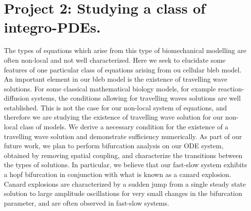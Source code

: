 \documentclass[11pt]{amsart}
\begin{document}
\section*{Project 2: Studying a class of integro-PDEs.}
The types of equations which arise from this type of biomechanical modelling are often non-local and not well characterized. Here we seek to elucidate some features of one particular class of equations arising from ou cellular bleb model. An important element in our bleb model is the existence of travelling wave solutions. For some classical mathematical biology models, for example reaction-diffusion systems, the conditions allowing for travelling waves solutions are well established. This is not the case for our  non-local system of equations, and therefore we are studying the existence of travelling wave solution for our non-local class of models. We derive a necessary condition for the existence of a travelling wave solution and demonstrate sufficiency numerically. As part of our future work, we plan to perform bifurcation analysis on our ODE system, obtained by removing spatial coupling, and characterize the transitions between the types of solutions. In particular, we believe that our fast-slow system exhibits a hopf bifurcation in conjunction with what is known as a canard explosion. Canard explosions are characterized by a sudden jump from a single steady state solution to large amplitude oscillations for very small changes in the bifurcation parameter, and are often observed in fast-slow systems. 
\vfill
\end{document}
